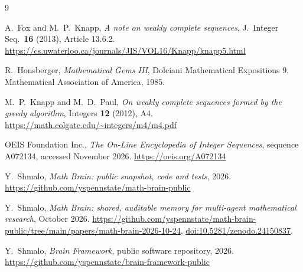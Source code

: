 \documentclass[11pt]{article}
\theoremstyle{remark}
\providecommand{\doi}[1]{\href{https://doi.org/#1}{doi:#1}}
\begin{document}
\begin{thebibliography}{9}

A.~Fox and M.~P.~Knapp,
\emph{A note on weakly complete sequences},
J.\ Integer Seq.\ \textbf{16} (2013), Article 13.6.2.
\url{https://cs.uwaterloo.ca/journals/JIS/VOL16/Knapp/knapp5.html}

R.~Honsberger,
\emph{Mathematical Gems III},
Dolciani Mathematical Expositions 9, Mathematical Association of America, 1985.

M.~P.~Knapp and M.~D.~Paul,
\emph{On weakly complete sequences formed by the greedy algorithm},
Integers \textbf{12} (2012), A4.
\url{https://math.colgate.edu/~integers/m4/m4.pdf}

OEIS Foundation Inc.,
\emph{The On-Line Encyclopedia of Integer Sequences}, sequence A072134, accessed November 2026.
\url{https://oeis.org/A072134}

Y.~Shmalo, \emph{Math Brain: public snapshot, code and tests}, 2026.
\url{https://github.com/yspennstate/math-brain-public}

Y.~Shmalo, \emph{Math Brain: shared, auditable memory for multi-agent mathematical research}, October 2026.
\url{https://github.com/yspennstate/math-brain-public/tree/main/papers/math-brain-2026-10-24},
\doi{10.5281/zenodo.24150837}.

Y.~Shmalo, \emph{Brain Framework}, public software repository, 2026.
\url{https://github.com/yspennstate/brain-framework-public}

\end{thebibliography}
\end{document}
